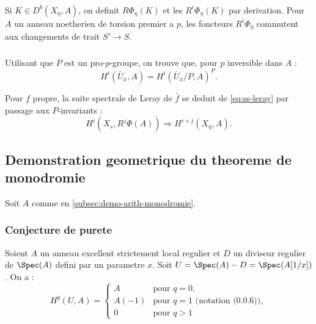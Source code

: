 \subsubsection{}
\label{subsubsec:2.6}
Si $K \in D^b(X_\eta, A)$, on definit $R\Phi_\eta(K)$ et les $R^i \Phi_\eta(K)$ par derivation. Pour $A$ un anneau noetherien de torsion premier a $p$, les foncteurs $R^i \Phi_\eta$ commutent aux changements de trait $S' \to S$.

\subsubsection{}
\label{subsubsec:2.7}
Utilisant que $P$ est un pro-$p$-groupe, on trouve que, pour $p$ inversible dans $A$ :
\begin{equation}
\label{eq:2.7.1}
H^i(\bar{U}_{\bar{x}}, A) = H^i(\bar{U}_{\bar{x}}/P, A)^P .
\end{equation}

Pour $f$ propre, la suite spectrale de Leray de $\bar{f}$ se deduit de \ref{eq:ss-leray} par passage aux $P$-invariants :
\begin{equation}
\label{eq:2.7.3}
H^i(X_s, R^j \Phi(A)) \Longrightarrow H^{i+j}(X_{\bar{\eta}}, A) .
\end{equation}

\subsection{Demonstration geometrique du theoreme de monodromie}
\label{subsec:demo-geom-monodromie}

Soit $A$ comme en \ref{subsec:demo-arith-monodromie}.

\subsubsection{Conjecture de purete}
\label{subsubsec:purete}

\begin{conjecture}[Purete]
\label{conj:purete}
Soient $A$ un anneau excellent strictement local regulier et $D$ un diviseur regulier de $\Spec(A)$ defini par un parametre $x$. Soit $U = \Spec(A) - D = \Spec(A[1/x])$. On a :
\[
H^q(U, A) =
\begin{cases}
A & \text{pour } q = 0, \\
A(-1) & \text{pour } q = 1 \text{ (notation (0.0.6))}, \\
0 & \text{pour } q > 1
\end{cases}
\]
\end{conjecture}

